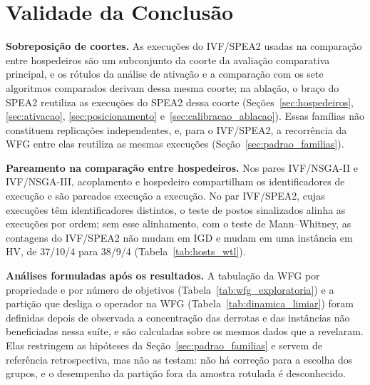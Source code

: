 \section{Validade da Conclusão}
\label{sec:validade_conclusao}

\textbf{Sobreposição de coortes.} As execuções do IVF/SPEA2 usadas na comparação entre hospedeiros são um subconjunto da coorte da avaliação comparativa principal, e os rótulos da análise de ativação e a comparação com os sete algoritmos comparados derivam dessa mesma coorte; na ablação, o braço do SPEA2 reutiliza as execuções do SPEA2 dessa coorte (Seções~\ref{sec:hospedeiros}, \ref{sec:ativacao}, \ref{sec:posicionamento} e~\ref{sec:calibracao_ablacao}). Essas famílias não constituem replicações independentes, e, para o IVF/SPEA2, a recorrência da WFG entre elas reutiliza as mesmas execuções (Seção~\ref{sec:padrao_familias}).

\textbf{Pareamento na comparação entre hospedeiros.} Nos pares IVF/NSGA-II e IVF/NSGA-III, acoplamento e hospedeiro compartilham os identificadores de execução e são pareados execução a execução. No par IVF/SPEA2, cujas execuções têm identificadores distintos, o teste de postos sinalizados alinha as execuções por ordem; sem esse alinhamento, com o teste de Mann--Whitney, as contagens do IVF/SPEA2 não mudam em IGD e mudam em uma instância em HV, de 37/10/4 para 38/9/4 (Tabela~\ref{tab:hosts_wtl}).

\textbf{Análises formuladas após os resultados.} A tabulação da WFG por propriedade e por número de objetivos (Tabela~\ref{tab:wfg_exploratoria}) e a partição que desliga o operador na WFG (Tabela~\ref{tab:dinamica_limiar}) foram definidas depois de observada a concentração das derrotas e das instâncias não beneficiadas nessa suíte, e são calculadas sobre os mesmos dados que a revelaram. Elas restringem as hipóteses da Seção~\ref{sec:padrao_familias} e servem de referência retrospectiva, mas não as testam: não há correção para a escolha dos grupos, e o desempenho da partição fora da amostra rotulada é desconhecido.
